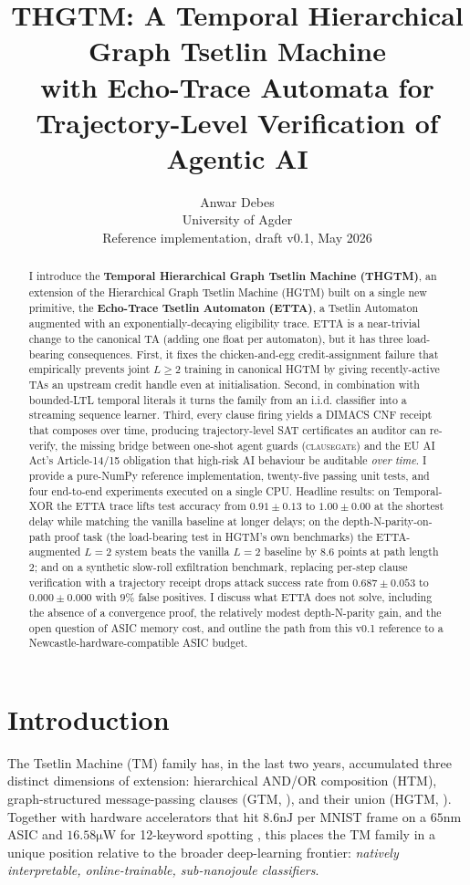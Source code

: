 \documentclass[11pt]{article}
\title{\textbf{THGTM: A Temporal Hierarchical Graph Tsetlin Machine\\with Echo-Trace Automata for Trajectory-Level Verification of Agentic AI}}
\author{Anwar Debes\\
University of Agder \\
\vspace{0.5em}
\small Reference implementation, draft v0.1, May 2026
}
\date{}
\begin{document}
\maketitle

\begin{abstract}
I introduce the \textbf{Temporal Hierarchical Graph Tsetlin Machine (THGTM)}, an extension of the Hierarchical Graph Tsetlin Machine (HGTM) built on a single new primitive, the \textbf{Echo-Trace Tsetlin Automaton (ETTA)}, a Tsetlin Automaton augmented with an exponentially-decaying eligibility trace.  ETTA is a near-trivial change to the canonical TA (adding one float per automaton), but it has three load-bearing consequences.  First, it fixes the chicken-and-egg credit-assignment failure that empirically prevents joint $L \!\geq\! 2$ training in canonical HGTM by giving recently-active TAs an upstream credit handle even at initialisation.  Second, in combination with bounded-LTL temporal literals it turns the family from an i.i.d. classifier into a streaming sequence learner.  Third, every clause firing yields a DIMACS CNF receipt that composes over time, producing trajectory-level SAT certificates an auditor can re-verify, the missing bridge between one-shot agent guards (\textsc{clausegate}) and the EU AI Act's Article-14/15 obligation that high-risk AI behaviour be auditable \emph{over time}.  I provide a pure-NumPy reference implementation, twenty-five passing unit tests, and four end-to-end experiments executed on a single CPU.  Headline results: on Temporal-XOR the ETTA trace lifts test accuracy from $0.91 \pm 0.13$ to $1.00 \pm 0.00$ at the shortest delay while matching the vanilla baseline at longer delays; on the depth-N-parity-on-path proof task (the load-bearing test in HGTM's own benchmarks) the ETTA-augmented $L\!=\!2$ system beats the vanilla $L\!=\!2$ baseline by 8.6 points at path length 2; and on a synthetic slow-roll exfiltration benchmark, replacing per-step clause verification with a trajectory receipt drops attack success rate from $0.687 \pm 0.053$ to $0.000 \pm 0.000$ with $9\%$ false positives.  I discuss what ETTA does not solve, including the absence of a convergence proof, the relatively modest depth-N-parity gain, and the open question of ASIC memory cost, and outline the path from this v0.1 reference to a Newcastle-hardware-compatible ASIC budget.
\end{abstract}

\section{Introduction}
The Tsetlin Machine (TM) family \citep{granmo2018tsetlin} has, in the last two years, accumulated three distinct dimensions of extension: hierarchical AND/OR composition (HTM), graph-structured message-passing clauses (GTM, \citealp{granmo2025graphtm}), and their union (HGTM, \citealp{anwar2026hgtm}).  Together with hardware accelerators that hit $8.6 \mathrm{nJ}$ per MNIST frame on a $65\mathrm{nm}$ ASIC \citep{tunheim2025convcotm} and $16.58 \mathrm{\mu W}$ for 12-keyword spotting \citep{tsetlinkws2025}, this places the TM family in a unique position relative to the broader deep-learning frontier: \emph{natively interpretable, online-trainable, sub-nanojoule classifiers}.
\end{document}
